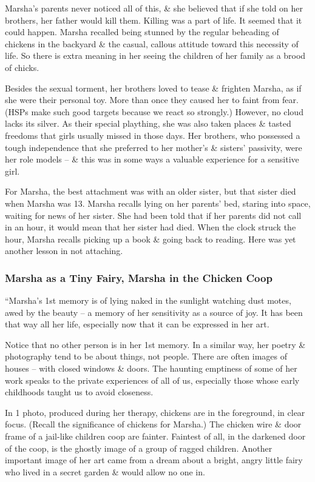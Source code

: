 \documentclass{article}
\numberwithin{equation}{section}
\begin{document}
Marsha's parents never noticed all of this, \& she believed that if she told on her brothers, her father would kill them. Killing was a part of life. It seemed that it could happen. Marsha recalled being stunned by the regular beheading of chickens in the backyard \& the casual, callous attitude toward this necessity of life. So there is extra meaning in her seeing the children of her family as a brood of chicks.

Besides the sexual torment, her brothers loved to tease \& frighten Marsha, as if she were their personal toy. More than once they caused her to faint from fear. (HSPs make such good targets because we react so strongly.) However, no cloud lacks its silver. As their special plaything, she was also taken places \& tasted freedoms that girls usually missed in those days. Her brothers, who possessed a tough independence that she preferred to her mother's \& sisters' passivity, were her role models -- \& this was in some ways a valuable experience for a sensitive girl.

For Marsha, the best attachment was with an older sister, but that sister died when Marsha was 13. Marsha recalls lying on her parents' bed, staring into space, waiting for news of her sister. She had been told that if her parents did not call in an hour, it would mean that her sister had died. When the clock struck the hour, Marsha recalls picking up a book \& going back to reading. Here was yet another lesson in not attaching.

\subsubsection{Marsha as a Tiny Fairy, Marsha in the Chicken Coop}
``Marsha's 1st memory is of lying naked in the sunlight watching dust motes, awed by the beauty -- a memory of her sensitivity as a source of joy. It has been that way all her life, especially now that it can be expressed in her art.

Notice that no other person is in her 1st memory. In a similar way, her poetry \& photography tend to be about things, not people. There are often images of houses -- with closed windows \& doors. The haunting emptiness of some of her work speaks to the private experiences of all of us, especially those whose early childhoods taught us to avoid closeness.

In 1 photo, produced during her therapy, chickens are in the foreground, in clear focus. (Recall the significance of chickens for Marsha.) The chicken wire \& door frame of a jail-like children coop are fainter. Faintest of all, in the darkened door of the coop, is the ghostly image of a group of ragged children. Another important image of her art came from a dream about a bright, angry little fairy who lived in a secret garden \& would allow no one in.
\end{document}
